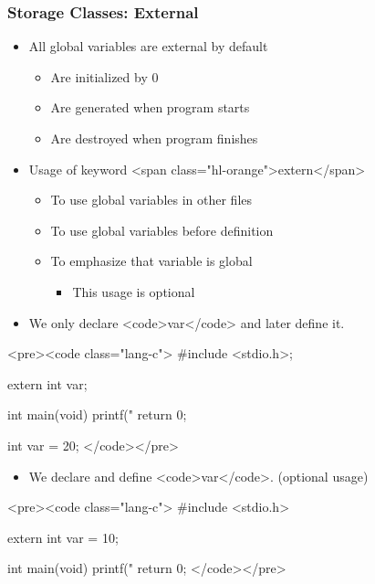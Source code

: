 \documentclass{../c-lecture}
\begin{document}
\begin{frame}
  \begin{frame}
    \frametitle{Storage Classes: External}
    \begin{itemize}
      \item All global variables are external by default
      \begin{itemize}
        \item Are initialized by 0
        \item Are generated when program starts
        \item Are destroyed when program finishes
      \end{itemize}
      \item Usage of keyword <span class="hl-orange">extern</span>
      \begin{itemize}
        \item To use global variables in other files
        \item To use global variables before definition
        \item To emphasize that variable is global
        \begin{itemize}
          \item This usage is optional
        \end{itemize}
      \end{itemize}
    \end{itemize}
  \end{frame}
  \begin{frame}
    \begin{itemize}
      \item We only declare <code>var</code> and later define it.
    \end{itemize}
    <pre><code class="lang-c">
#include <stdio.h>;

extern int var;

int main(void)
{
  printf("%
  return 0;
}

int var = 20;
    </code></pre>
    \begin{itemize}
      \item We declare and define <code>var</code>. (optional usage)
    \end{itemize}
    <pre><code class="lang-c">
#include <stdio.h>

extern int var = 10;

int main(void)
{
  printf("%
  return 0;
}
    </code></pre>
  \end{frame}
\end{frame}
\end{document}
